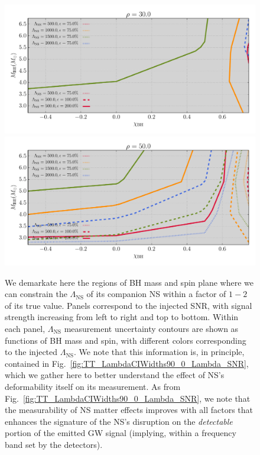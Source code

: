 \documentclass[aps,prd,amsmath,floats,floatfix, twocolumn,
superscriptaddress,nofootinbib,showpacs]{revtex4-1}
\newcommand{\lambdans}{\Lambda_\mathrm{NS}}
\begin{document}
\begin{figure}
\centering    
\includegraphics[width=1.\columnwidth]{plots/TTLambdaErrorCurves_BHspin_BHmass_SNR30_CI90_0.pdf}
\includegraphics[width=1.\columnwidth]{plots/TTLambdaErrorCurves_BHspin_BHmass_SNR50_CI90_0.pdf}\\
\caption{We demarkate here the regions of BH mass and spin plane where we can 
constrain the $\lambdans$ of its companion NS within a factor of $1-2$ of its true value.
Panels correspond to the injected SNR, with signal strength increasing
from left to right and top to bottom. Within each panel, $\lambdans$ measurement uncertainty
contours are shown as functions of BH mass and spin, with different colors corresponding to the
injected $\lambdans$. We note that this information is, in principle, contained in 
Fig.~\ref{fig:TT_LambdaCIWidths90_0_Lambda_SNR}, which we gather here to better understand
the effect of NS's deformability itself on its measurement. As from Fig.~\ref{fig:TT_LambdaCIWidths90_0_Lambda_SNR}, we note that the measurability of NS matter
effects improves with all factors that enhances the signature of the NS's disruption on
the \textit{detectable} portion of the emitted GW signal (implying, within a frequency band
set by the detectors).
}
\label{fig:TT_LambdaErrorCurves_BHspin_BHmass_CI90_0}
\end{figure}
\end{document}
